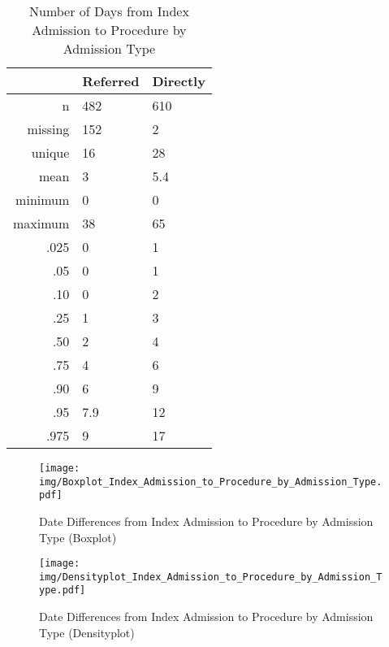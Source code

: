 \documentclass[a4paper]{report}
\begin{document}
\begin{itemize}
{%
\begin{table}[ht]
\centering
\begin{tabular}{rll}
  \toprule
 & Referred & Directly \\ 
  \midrule
n & 482 & 610 \\ 
  missing & 152 & 2 \\ 
  unique & 16 & 28 \\ 
  mean & 3 & 5.4 \\ 
  minimum & 0 & 0 \\ 
  maximum & 38 & 65 \\ 
  .025 & 0 & 1 \\ 
  .05 & 0 & 1 \\ 
  .10 & 0 & 2 \\ 
  .25 & 1 & 3 \\ 
  .50 & 2 & 4 \\ 
  .75 & 4 & 6 \\ 
  .90 & 6 & 9 \\ 
  .95 & 7.9 & 12 \\ 
  .975 & 9 & 17 \\ 
   \bottomrule
\end{tabular}
\caption{Number of Days from Index Admission to Procedure by Admission Type} 
\end{table}
\begin{figure}
  \centering
  \caption{Date Differences from Index Admission to Procedure by Admission Type (Boxplot)}
  \label{Boxplot: Date Differences from Index Admission to Procedure by Admission Type}
\texttt{[image: img/Boxplot\_Index\_Admission\_to\_Procedure\_by\_Admission\_Type.pdf]}\end{figure}


\begin{figure}
  \centering
  \caption{Date Differences from Index Admission to Procedure by Admission Type (Densityplot)}
  \label{Density: Date Differences from Index Admission to Procedure by Admission Type}
\texttt{[image: img/Densityplot\_Index\_Admission\_to\_Procedure\_by\_Admission\_Type.pdf]}\end{figure}



\clearpage

}
\end{itemize}
\end{document}
